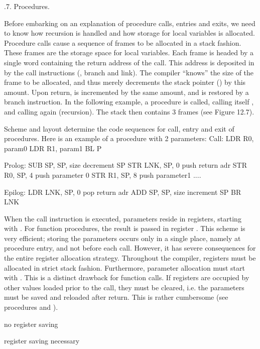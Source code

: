 .7. Procedures.

Before embarking on an explanation of procedure calls, entries and exits, we need to know how recursion is handled and how storage for local variables is allocated. Procedure calls cause a sequence of frames to be allocated in a stack fashion. These frames are the storage space for local variables. Each frame is headed by a single word containing the return address of the call. This address is deposited in  by the call instructions (, branch and link). The compiler ``knows'' the size of the frame to be allocated, and thus merely decrements the stack pointer  () by this amount. Upon return,  is incremented by the same amount, and  is restored by a branch instruction. In the following example, a procedure  is called, calling itself , and  calling  again (recursion). The stack then contains 3 frames (see Figure 12.7).

Scheme and layout determine the code sequences for call, entry and exit of procedures. Here is an example of a procedure  with 2 parameters:
\begintt
Call:    LDR R0, param0 
         LDR R1, param1
         BL P

Prolog:  SUB SP, SP, size   decrement SP
         STR LNK, SP, 0     push return adr 
         STR R0, SP, 4      push parameter 0 
         STR R1, SP, 8      push parameter1 ....

Epilog:  LDR LNK, SP, 0     pop return adr
         ADD SP, SP, size   increment SP
         BR LNK
\endtt

\noindent When the call instruction is executed, parameters reside in registers, starting with . For function procedures, the result is passed in register . This scheme is very efficient; storing the parameters occurs only in a single place, namely at procedure entry, and not before each call. However, it has severe consequences for the entire register allocation strategy. Throughout the compiler, registers must be allocated in strict stack fashion. Furthermore, parameter allocation must start with . This is a distinct drawback for function calls. If registers are occupied by other values loaded prior to the call, they must be cleared, i.e. the parameters must be saved and reloaded after return. This is rather cumbersome (see procedures  and ).
\smallskip
\item{}  no register saving
\item{} 
\item{} 
\item{}  register saving necessary
\smallskip

